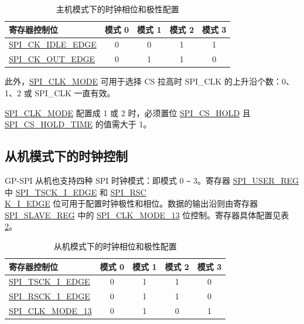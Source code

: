 \documentclass[main\_\_CN.tex]{subfiles}
\begin{document}
\begin{table}[H]
    \centering
    \caption{主机模式下的时钟相位和极性配置}
    \label{table:clock_pol_master}
    \begin{tabular}[c]{|p{3.5cm}|c|c|c|c|}
    \hline
    \rowcolor{lightgray}
    \textbf{寄存器控制位} & \textbf{模式 0} & \textbf{模式 1} & \textbf{模式 2} & \textbf{模式 3}\\
    \hline
    \hyperref[fielddesc:SPICKIDLEEDGE]{SPI\_CK\_IDLE\_EDGE}  & 0     & 0     & 1     & 1\\
    \hline
    \hyperref[fielddesc:SPICKOUTEDGE]{SPI\_CK\_OUT\_EDGE}   & 0     & 1     & 1     & 0\\
    \hline
    \end{tabular}
\end{table}

此外，\hyperref[fielddesc:SPICLKMODE]{SPI\_CLK\_MODE} 可用于选择 CS 拉高时 SPI\_CLK 的上升沿个数：0、1、2 或 SPI\_CLK 一直有效。

\begin{tiplisting}
 \hyperref[fielddesc:SPICLKMODE]{SPI\_CLK\_MODE} 配置成 1 或 2 时，必须置位  \hyperref[fielddesc:SPICSHOLD]{SPI\_CS\_HOLD} 且  \hyperref[fielddesc:SPICSHOLDTIME]{SPI\_CS\_HOLD\_TIME} 的值需大于 1。
\end{tiplisting}
\vspace{-1em}

\subsection{从机模式下的时钟控制}\label{GP-SPI slave clock control}

GP-SPI 从机也支持四种 SPI 时钟模式：即模式 0 \verb+~+ 3。寄存器  \hyperref[regdesc:SPIUSERREG]{SPI\_USER\_REG} 中  \hyperref[fielddesc:SPITSCKIEDGE]{SPI\_TSCK\_I\_EDGE} 和  \hyperref[fielddesc:SPIRSCKIEDGE]{SPI\_RSC\\K\_I\_EDGE} 位可用于配置时钟极性和相位。数据的输出沿则由寄存器  \hyperref[regdesc:SPISLAVEREG]{SPI\_SLAVE\_REG} 中的  \hyperref[fielddesc:SPICLKMODE13]{SPI\_CLK\_MODE\_13} 位控制。寄存器具体配置见表  \ref{table:clock_pol_slave}。

\begin{table}[H]
    \centering
    \caption{从机模式下的时钟相位和极性配置}
    \label{table:clock_pol_slave}
    \begin{tabular}[c]{|p{3.5cm}|c|c|c|c|}
    \hline
    \rowcolor{lightgray}
    \textbf{寄存器控制位} & \textbf{模式 0} & \textbf{模式 1} & \textbf{模式 2} & \textbf{模式 3}\\
    \hline
    \hyperref[fielddesc:SPITSCKIEDGE]{SPI\_TSCK\_I\_EDGE}   & 0 & 1 & 1 & 0\\
    \hline
    \hyperref[fielddesc:SPIRSCKIEDGE]{SPI\_RSCK\_I\_EDGE}   & 0 & 1 & 1 & 0\\
    \hline
    \hyperref[fielddesc:SPICLKMODE13]{SPI\_CLK\_MODE\_13}     & 0 & 1 & 0 & 1\\
    \hline
    \end{tabular}
\end{table}
\end{document}
